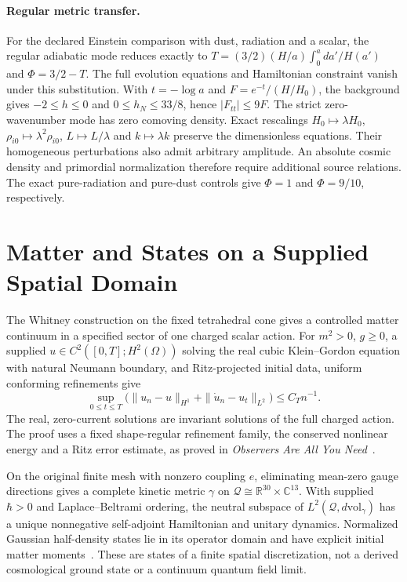 \documentclass[11pt]{article}
\theoremstyle{remark}
\theoremstyle{plain}
\begin{document}
\paragraph{Regular metric transfer.}
For the declared Einstein comparison with dust, radiation and a scalar,
the regular adiabatic mode reduces exactly to
$T=(3/2)(H/a)\int_0^a da'/H(a')$ and $\Phi=3/2-T$.
The full evolution equations and Hamiltonian constraint vanish under this
substitution. With $t=-\log a$ and $F=e^{-t}/(H/H_0)$, the background gives
$-2\leq h\leq0$ and $0\leq h_N\leq33/8$, hence $|F_{tt}|\leq9F$.
The strict zero-wavenumber mode has zero comoving density. Exact rescalings
$H_0\mapsto\lambda H_0$, $\rho_{i0}\mapsto\lambda^2\rho_{i0}$,
$L\mapsto L/\lambda$ and $k\mapsto\lambda k$ preserve the dimensionless
equations. Their homogeneous perturbations also admit arbitrary amplitude.
An absolute cosmic density and primordial normalization therefore require
additional source relations. The exact pure-radiation and pure-dust
controls give $\Phi=1$ and $\Phi=9/10$, respectively.

\section{Matter and States on a Supplied Spatial Domain}

The Whitney construction on the fixed tetrahedral cone gives a controlled
matter continuum in a specified sector of one charged scalar action. For
\(m^2>0\), \(g\geq0\), a supplied
\(u\in C^2([0,T];H^2(\Omega))\) solving the real cubic Klein--Gordon
equation with natural Neumann boundary, and Ritz-projected initial data,
uniform conforming refinements give
\[
 \sup_{0\leq t\leq T}
 \bigl(\|u_n-u\|_{H^1}+\|\dot u_n-u_t\|_{L^2}\bigr)
 \leq C_T n^{-1}.
\]
The real, zero-current solutions are invariant solutions of the full
charged action. The proof uses a fixed shape-regular refinement family,
the conserved nonlinear energy and a Ritz error estimate, as proved in
\emph{Observers Are All You Need}~\cite{ophobservers}.

On the original finite mesh with nonzero coupling \(e\), eliminating
mean-zero gauge directions gives a
complete kinetic metric \(\gamma\) on
\(\mathcal Q\cong\mathbb R^{30}\times\mathbb C^{13}\). With supplied
\(\hbar>0\) and Laplace--Beltrami ordering, the neutral subspace of
\(L^2(\mathcal Q,d\mathrm{vol}_\gamma)\) has a unique nonnegative
self-adjoint Hamiltonian and unitary dynamics. Normalized Gaussian
half-density states lie in its operator domain and have explicit initial
matter moments~\cite{ophobservers}. These
are states of a finite spatial discretization, not a derived cosmological
ground state or a continuum quantum field limit.
\end{document}
